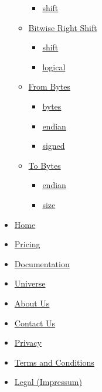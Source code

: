 \begin{itemize}
\begin{itemize}
    \begin{itemize}
    \tightlist
    \item
      \hyperref[definitions-bit-lshift-shift]{shift}
    \end{itemize}
  \item
    \hyperref[definitions-bit-rshift]{Bitwise Right Shift}

    \begin{itemize}
    \tightlist
    \item
      \hyperref[definitions-bit-rshift-shift]{shift}
    \item
      \hyperref[definitions-bit-rshift-logical]{logical}
    \end{itemize}
  \item
    \hyperref[definitions-from-bytes]{From Bytes}

    \begin{itemize}
    \tightlist
    \item
      \hyperref[definitions-from-bytes-bytes]{bytes}
    \item
      \hyperref[definitions-from-bytes-endian]{endian}
    \item
      \hyperref[definitions-from-bytes-signed]{signed}
    \end{itemize}
  \item
    \hyperref[definitions-to-bytes]{To Bytes}

    \begin{itemize}
    \tightlist
    \item
      \hyperref[definitions-to-bytes-endian]{endian}
    \item
      \hyperref[definitions-to-bytes-size]{size}
    \end{itemize}
  \end{itemize}
\end{itemize}

\begin{itemize}
\tightlist
\item
  \href{/}{Home}
\item
  \href{/pricing/}{Pricing}
\item
  \href{/docs/}{Documentation}
\item
  \href{/universe/}{Universe}
\item
  \href{/about/}{About Us}
\item
  \href{/contact/}{Contact Us}
\item
  \href{/privacy/}{Privacy}
\item
  \href{https://typst.app/terms}{Terms and Conditions}
\item
  \href{/legal/}{Legal (Impressum)}
\end{itemize}

